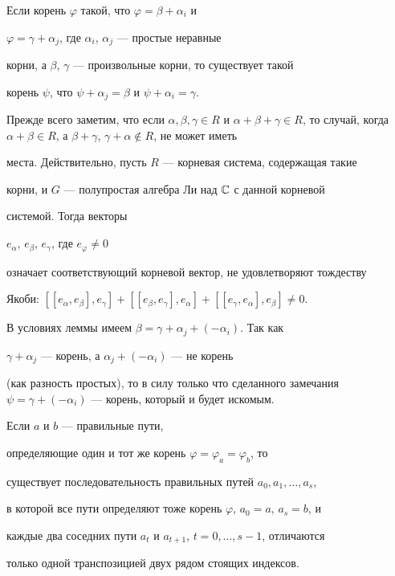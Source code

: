 \begin{lem}


Если корень $\varphi$ такой, что $\varphi=\beta+\alpha_i$ и


$\varphi=\gamma+\alpha_j$, где $\alpha_i$, $\alpha_j$ --- простые неравные


корни, а $\beta$, $\gamma$ --- произвольные корни, то существует такой


корень $\psi$, что $\psi+\alpha_j=\beta$ и $\psi+\alpha_i=\gamma$.


\end{lem}





\begin{pf}


Прежде всего заметим, что если $\alpha,\beta,


\gamma\in R$ и $\alpha+\beta+\gamma\in R$, то случай, когда $\alpha+


\beta\in R$, а $\beta+\gamma$, $\gamma+\alpha\notin R$, не может иметь


места. Действительно, пусть $R$ --- корневая система, содержащая такие


корни, и $G$ --- полупростая алгебра Ли над $\Bbb C$ с данной корневой


системой. Тогда векторы


$e_\alpha$, $e_\beta$, $e_\gamma$, где $e_\varphi\ne0$


означает соответствующий корневой вектор, не удовлетворяют тождеству


Якоби: $[[e_\alpha,e_\beta],e_\gamma]+[[e_\beta,e_\gamma],e_\alpha]+


[[e_\gamma,e_\alpha],e_\beta]\ne 0$.





В условиях леммы имеем $\beta=\gamma+\alpha_j+(-\alpha_i)$. Так как


$\gamma+\alpha_j$ --- корень, а $\alpha_j+(-\alpha_i)$ --- не корень


(как разность простых), то в силу только что сделанного замечания $\psi


=\gamma+(-\alpha_i)$ --- корень, который и будет искомым.


\end{pf}





\begin{prop}


Если $a$ и $b$ --- правильные пути,


определяющие один и тот же корень $\varphi =\varphi_a=\varphi_b$, то


существует последовательность правильных путей $a_0,a_1,\dotsc,a_s$,


в которой все пути определяют тоже корень $\varphi$, $a_0=a$, $a_s=b$, и


каждые два соседних пути $a_t$ и $a_{t+1}$, $t=0,\dotsc,s-1$, отличаются


только одной транспозицией двух рядом стоящих индексов.


\end{prop}





